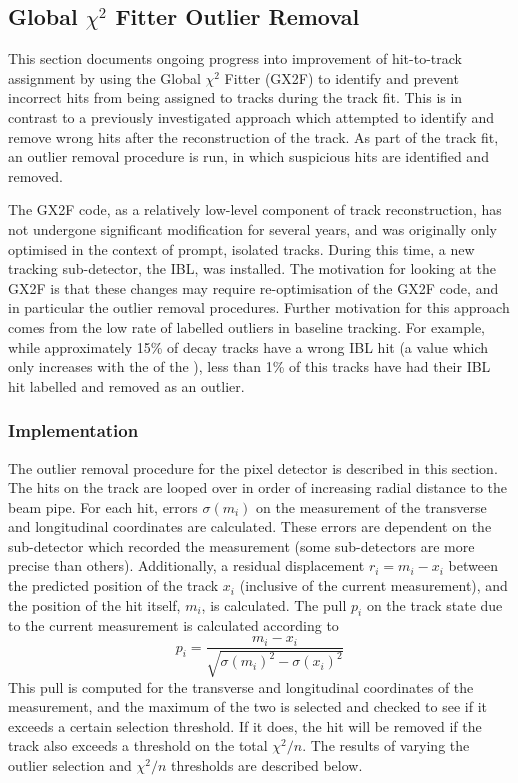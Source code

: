 \subsection{Global \texorpdfstring{$\chi^2$}{chi2} Fitter Outlier Removal}\label{sec:gx2f_opt}

This section documents ongoing progress into improvement of hit-to-track assignment by using the Global $\chi^2$ Fitter (GX2F) to identify and prevent incorrect hits from being assigned to tracks during the track fit.
This is in contrast to a previously investigated approach \cite{AdorniBraccesiChiassi:2021irw} which attempted to identify and remove wrong hits after the reconstruction of the track.
As part of the track fit, an outlier removal procedure is run, in which suspicious hits are identified and removed.

The GX2F code, as a relatively low-level component of track reconstruction, has not undergone significant modification for several years, and was originally only optimised in the context of prompt, isolated tracks.
During this time, a new tracking sub-detector, the IBL, was installed.
The motivation for looking at the GX2F is that these changes may require re-optimisation of the GX2F code, and in particular the outlier removal procedures.
Further motivation for this approach comes from the low rate of labelled outliers in baseline tracking.
For example, while approximately 15\% of \bhadron decay tracks have a wrong IBL hit (a value which only increases with the \pT of the \bhadron), less than 1\% of this tracks have had their IBL hit labelled and removed as an outlier.


\subsubsection{Implementation}
The outlier removal procedure for the pixel detector is described in this section. The hits on the track are looped over in order of increasing radial distance to the beam pipe. For each hit, errors $\sigma(m_i)$ on the measurement of the transverse and longitudinal coordinates are calculated. These errors are dependent on the sub-detector which recorded the measurement (some sub-detectors are more precise than others). Additionally, a residual displacement $r_i = m_i - x_i$ between the predicted position of the track $x_i$ (inclusive of the current measurement), and the position of the hit itself, $m_i$, is calculated. The pull $p_i$ on the track state due to the current measurement is calculated according to
%
\begin{equation}
    p_i = \frac{m_i - x_i}{\sqrt{\sigma(m_i)^2 - \sigma(x_i)^2}}
\end{equation}
%
This pull is computed for the transverse and longitudinal coordinates of the measurement, and the maximum of the two is selected and checked to see if it exceeds a certain selection threshold. If it does, the hit will be removed if the track also exceeds a threshold on the total $\chi^2/n$.
The results of varying the outlier selection and $\chi^2/n$ thresholds are described below.


